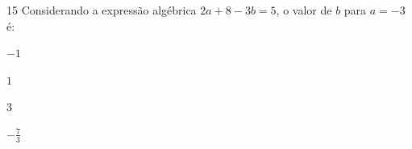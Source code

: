 
\num{15} Considerando a expressão algébrica $2a + 8 - 3b = 5$, o valor de $b$
para $a = - 3$ é:

\begin{escolha}
\item $- 1$
\item $1$
\item $3$
\item $- \frac{7}{3}$
\end{escolha}



